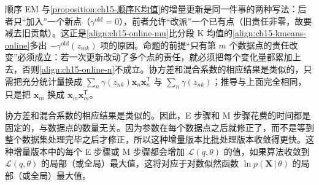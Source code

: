 \documentclass[../../main.tex]{subfiles}
\begin{document}
\begin{remark}
顺序 EM 与\cref{proposition:ch15-顺序K均值}的增量更新是同一件事的两种写法：后者只“加入”一个新点（$\gamma^{\text{old}}=0$），前者允许“改派”一个已有点（旧责任非零，故要减去旧贡献）。这正是\eqref{align:ch15-online-mu}比分段 K 均值的\eqref{align:ch15-kmeans-online}多出 $-\gamma^{\text{old}}(z_{mk})$ 项的原因。命题的前提“只有第 $m$ 个数据点的责任改变”必须成立：若一次更新改动了多个点的责任，就必须把每个变化量都累加上去，否则\eqref{align:ch15-online-n}不成立。协方差和混合系数的相应结果是类似的，只需把充分统计量换成 $\sum_n\gamma(z_{nk})\bm{x}_n\bm{x}_n^{\mathsf T}$ 与 $\sum_n\gamma(z_{nk})$；推导与上面完全相同，只是把 $\bm{x}_m$ 换成 $\bm{x}_m\bm{x}_m^{\mathsf T}$。
\end{remark}

协方差和混合系数的相应结果是类似的。因此，E 步骤和 M 步骤花费的时间都是固定的，与数据点的数量无关。因为参数在每个数据点之后就修正了，而不是等到整个数据集处理完毕之后才修正，所以这种增量版本比批处理版本收敛得更快。这种增量版本中的每个 E 步骤或 M 步骤都会增加 $\mathcal{L}(q,\theta)$ 的值，如果算法收敛到 $\mathcal{L}(q,\theta)$ 的局部（或全局）最大值，这将对应于对数似然函数 $\ln p(\bm{X}\,|\,\theta)$ 的局部（或全局）最大值。
\end{document}
